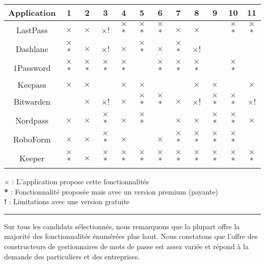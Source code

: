 \begin{center}
	\centering
	\begin{tabular}{|c|c|c|c|c|c|c|c|c|c|c|c|}
		\hline
		Application & 1 & 2 & 3 & 4 & 5 & 6 & 7 & 8 & 9 & 10 & 11  \\
		\hline
		LastPass & $\times$ & $\times$ & $\times$! & $\times$* & $\times$* &  $\times$*& $\times$ & $\times$ & & $\times$* & $\times$* \\
				\hline
		Dashlane\footnotemark & $\times$* & $\times$ & $\times$! & $\times$ & $\times$* & $\times$ & $\times$* & $\times$! & & & \\
				\hline
		1Password & $\times$* & $\times$* & $\times$* & $\times$* & & $\times$* & $\times$* & $\times$* & & $\times$* & \\
				\hline
		Keepass \footnotemark & $\times$ & $\times$ &  & $\times$ & $\times$ & & & $\times$ & $\times$ & & $\times$ \\
				\hline
		Bitwarden &  & $\times$  & $\times$! & $\times$ & $\times$* & $\times$* & $\times$ & $\times$! & $\times$* &  $\times$* & $\times$! \\
				\hline
		Nordpass & $\times$ & $\times$ & $\times$*  & $\times$ & $\times$* & & $\times$ & $\times$ & $\times$* & $\times$* & $\times$ \\
				\hline
		RoboForm & $\times$ & $\times$ & $\times$* & $\times$ & & $\times$ & $\times$* & $\times$* & $\times$* & $\times$* & \\
				\hline
		Keeper\footnotemark & $\times$* & $\times$\footnotemark & $\times$* & $\times$* &$\times$* & $\times$* & $\times$* &$\times$* &$\times$* & $\times$* & $\times$* \\
		\hline
	\end{tabular}
\addtocounter{footnote}{-4} 
\end{center}
$\times$ : L'application propose cette fonctionnalités \\
\textbf{*}\hspace{0.1cm} : Fonctionnalité proposée mais avec un version premium (payante) \\
\textbf{!}\hspace{0.18cm} : Limitations avec une version gratuite \\
\rule{\linewidth}{.5pt}
Sur tous les candidats sélectionnés, nous remarquons que la plupart offre la majorité des fonctionnalités énumérées plus haut. Nous constatons que l'offre des constructeurs de gestionnaires de mots de passe est assez variée et répond à la demande des particuliers et des entreprises.
 
